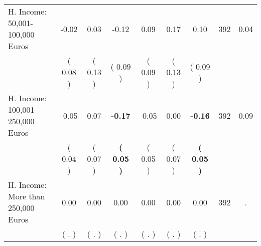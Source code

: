\begin{tabular}{lcccccccc}
H. Income: 50,001-100,000 Euros &     -0.02 &      0.03 &     -0.12 &      0.09 &      0.17 &      0.10 & 392 &       0.04 \\ 
 & (     0.08 ) & (     0.13 ) & (     0.09 ) & (     0.09 ) & (     0.13 ) & (     0.09 ) & \\
H. Income: 100,001-250,000 Euros &     -0.05 &      0.07 & \textbf{    -0.17} &     -0.05 &      0.00 & \textbf{    -0.16} & 392 &       0.09 \\ 
 & (     0.04 ) & (     0.07 ) & \textbf{(     0.05 )} & (     0.05 ) & (     0.07 ) & \textbf{(     0.05 )} & \\
H. Income: More than 250,000 Euros &      0.00 &      0.00 &      0.00 &      0.00 &      0.00 &      0.00 & 392 &          . \\ 
 & (        . ) & (        . ) & (        . ) & (        . ) & (        . ) & (        . ) & \\
\bottomrule
\end{tabular}
